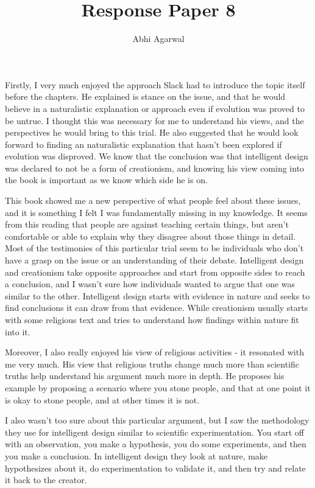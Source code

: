 \documentclass[11pt, oneside]{article}
\title{Response Paper 8}
\author{Abhi Agarwal}
\date{}
\begin{document}
\maketitle

\par Firstly, I very much enjoyed the approach Slack had to introduce the topic itself before the chapters. He explained is stance on the issue, and that he would believe in a naturalistic explanation or approach even if evolution was proved to be untrue. I thought this was necessary for me to understand his views, and the perspectives he would bring to this trial. He also suggested that he would look forward to finding an naturalistic explanation that hasn't been explored if evolution was disproved. We know that the conclusion was that intelligent design was declared to not be a form of creationism, and knowing his view coming into the book is important as we know which side he is on. 

\par This book showed me a new perspective of what people feel about these issues, and it is something I felt I was fundamentally missing in my knowledge. It seems from this reading that people are against teaching certain things, but aren't comfortable or able to explain why they disagree about those things in detail. Most of the testimonies of this particular trial seem to be individuals who don't have a grasp on the issue or an understanding of their debate. Intelligent design and creationism take opposite approaches and start from opposite sides to reach a conclusion, and I wasn't sure how individuals wanted to argue that one was similar to the other. Intelligent design starts with evidence in nature and seeks to find conclusions it can draw from that evidence. While creationism usually starts with some religious text and tries to understand how findings within nature fit into it. 

\par Moreover, I also really enjoyed his view of religious activities - it resonated with me very much. His view that religious truths change much more than scientific truths help understand his argument much more in depth. He proposes his example by proposing a scenario where you stone people, and that at one point it is okay to stone people, and at other times it is not. 

\par I also wasn't too sure about this particular argument, but I saw the methodology they use for intelligent design similar to scientific experimentation. You start off with an observation, you make a hypothesis, you do some experiments, and then you make a conclusion. In intelligent design they look at nature, make hypothesizes about it, do experimentation to validate it, and then try and relate it back to the creator.  
\end{document}
